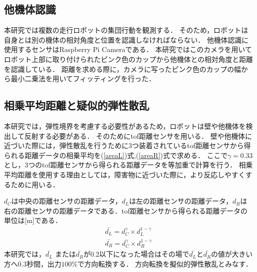 \documentclass[twocolumn,dvipdfmx]{jarticle}
\begin{document}
\subsection{他機体認識}
本研究では複数の走行ロボットの集団行動を観測する．
そのため，ロボットは自身とは別の機体の相対角度と位置を認識しなければならない．
他機体認識に使用するセンサはRaspberry Pi Cameraである．
本研究ではこのカメラを用いてロボット上部に取り付けられたピンク色のカップから他機体との相対角度と距離を認識している．
距離を求める際に，カメラに写ったピンク色のカップの幅から最小二乗法を用いてフィッティングを行った．
\vspace{-1.5mm}
\subsection{相乗平均距離と疑似的弾性散乱}
本研究では，弾性境界を考慮する必要性があるため，ロボットは壁や他機体を検出して反射する必要がある．
そのためにtof距離センサを用いる．
壁や他機体に近づいた際には，弾性散乱を行うために3つ装着されているtof距離センサから得られる距離データの相乗平均を(\ref{areaL})式,(\ref{areaR})式で求める．
ここで$ \gamma = 0.33 $とし，3つのtof距離センサから得られる距離データを等加重で計算を行う．
相乗平均距離を使用する理由としては，障害物に近づいた際に，より反応しやすくするために用いる．

$d_{C} $は中央の距離センサの距離データ，$d_{L} $は左の距離センサの距離データ，$d_{R} $は右の距離センサの距離データである．tof距離センサから得られる距離データの単位は[m]である．
\begin{eqnarray}
\label{areaL}
\bar{d_{L}} = d_{C}^{\gamma} \times d_{L}^{1 - \gamma} \\
\bar{d_{R}} = d_{C}^{\gamma} \times d_{R}^{1 - \gamma}
\label{areaR}
\end{eqnarray}
本研究では，$\bar{d_{L}}$ または$\bar{d_{R}}$が$0.2$以下になった場合はその場で$\bar{d_{L}}$と$\bar{d_{R}}$の値が大きい方へ$0.3$秒間，出力$100\%$で方向転換する．
方向転換を擬似的弾性散乱とみなす．
\vspace{-1.8mm}
\end{document}
